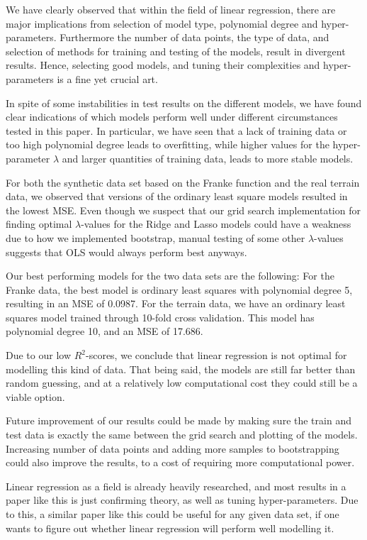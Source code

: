 We have clearly observed that within the field of linear regression, there are major implications from selection of model type, polynomial degree and hyper-parameters.
Furthermore the number of data points, the type of data, and selection of methods for training and testing of the models, result in divergent results.
Hence, selecting good models, and tuning their complexities and hyper-parameters is a fine yet crucial art.

In spite of some instabilities in test results on the different models, we have found clear indications of which models perform well under different circumstances tested in this paper.
In particular, we have seen that a lack of training data or too high polynomial degree leads to overfitting, while higher values for the hyper-parameter $\lambda$ and larger quantities of training data, leads to more stable models.

For both the synthetic data set based on the Franke function and the real terrain data, we observed that versions of the ordinary least square models resulted in the lowest MSE.
Even though we suspect that our grid search implementation for finding optimal $\lambda$-values for the Ridge and Lasso models could have a weakness due to how we implemented bootstrap, manual testing of some other $\lambda$-values suggests that OLS would always perform best anyways.

Our best performing models for the two data sets are the following:
For the Franke data, the best model is ordinary least squares with polynomial degree 5, resulting in an MSE of 0.0987.
For the terrain data, we have an ordinary least squares model trained through 10-fold cross validation.
This model has polynomial degree 10, and an MSE of 17.686.

Due to our low $R^2$-scores, we conclude that linear regression is not optimal for modelling this kind of data.
That being said, the models are still far better than random guessing, and at a relatively low computational cost they could still be a viable option.

Future improvement of our results could be made by making sure the train and test data is exactly the same between the grid search and plotting of the models.
Increasing number of data points and adding more samples to bootstrapping could also improve the results, to a cost of requiring more computational power.

Linear regression as a field is already heavily researched, and most results in a paper like this is just confirming theory, as well as tuning hyper-parameters.
Due to this, a similar paper like this could be useful for any given data set, if one wants to figure out whether linear regression will perform well modelling it.